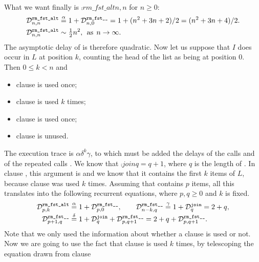 What we want finally is \(\comp{rm\_fst\_alt}{n,n}\) for \(n \geqslant 0\):
\begin{align*}
\comp{rm\_fst\_alt}{n,n} 
   &\eqn{\alpha} 1 + \comp{rm\_fst\_\_}{n,0} = 1 + (n^2 + 3n + 2)/2
   = (n^2 + 3n + 4)/2.\\
\comp{rm\_fst\_alt}{n,n}
   &\mathrel{\sim} \tfrac{1}{2} n^2,
\,\; \text{as} \;\, n \rightarrow \infty.
\end{align*}
The asymptotic delay of  is therefore
quadratic. Now let us suppose that \(I\) does occur in \(L\) at
position \(k\), counting the head of the list as being at position
\(0\). Then \(0 \leqslant k < n\) and
\begin{itemize}

  \item clause \clause{\alpha} is used once;

  \item clause \clause{\delta} is used \(k\) times;

  \item clause \clause{\gamma} is used once;

  \item clause \clause{\beta} is unused.

\end{itemize}
The execution trace is \(\alpha\delta^k\gamma\), to which must be
added the delays of the calls  and of the repeated
calls . We know that \(\comp{join}{q} = q + 1\),
where \(q\) is the length of . In clause \clause{\gamma},
this argument is  and we know that it contains the first
\(k\) items of \(L\), because clause \clause{\delta} was used \(k\)
times. Assuming that  contains \(p\) items, all this
translates into the following recurrent equations, where \(p,q
\geqslant 0\) and \(k\) is fixed.\label{delay:rm_fst_alt}
\begin{align*}
\comp{rm\_fst\_alt}{p,k}  &\eqn{\alpha} 1 + \comp{rm\_fst\_\_}{p,0},
\qquad
\comp{rm\_fst\_\_}{n-k,q} \eqn{\gamma} 1 + \comp{join}{q} = 2 + q,\\
\comp{rm\_fst\_\_}{p+1,q} &\eqn{\delta} 1 + \comp{join}{q} +
                             \comp{rm\_fst\_\_}{p,q+1}
                          = 2 + q + \comp{rm\_fst\_\_}{p,q+1}.
\end{align*}
Note that we only used the information about whether a clause is used
or not. Now we are going to use the fact that clause \clause{\delta}
is used \(k\) times, by telescoping the equation drawn from clause
